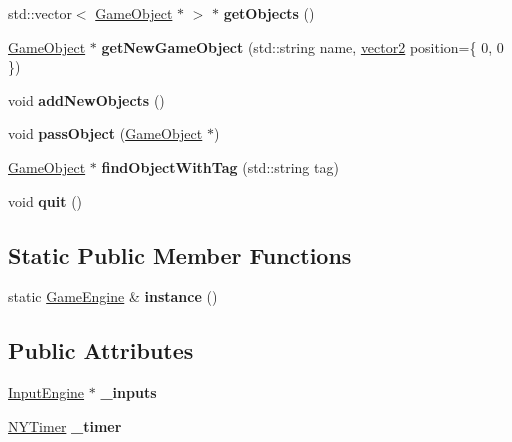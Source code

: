 \begin{DoxyCompactItemize}
\hypertarget{class_game_engine_a0ddc45d96adc0373346663302e429b12}{}\label{class_game_engine_a0ddc45d96adc0373346663302e429b12} 
std\+::vector$<$ \hyperlink{class_game_object}{Game\+Object} $\ast$ $>$ $\ast$ {\bfseries get\+Objects} ()
\item 
\hypertarget{class_game_engine_a5881933816240d7c21d66383ad3abdae}{}\label{class_game_engine_a5881933816240d7c21d66383ad3abdae} 
\hyperlink{class_game_object}{Game\+Object} $\ast$ {\bfseries get\+New\+Game\+Object} (std\+::string name, \hyperlink{structvector2}{vector2} position=\{ 0, 0 \})
\item 
\hypertarget{class_game_engine_a93ae1a7543981d2d3d0e70b14174135f}{}\label{class_game_engine_a93ae1a7543981d2d3d0e70b14174135f} 
void {\bfseries add\+New\+Objects} ()
\item 
\hypertarget{class_game_engine_a49e995c66c1c09394c75d31cbea4b691}{}\label{class_game_engine_a49e995c66c1c09394c75d31cbea4b691} 
void {\bfseries pass\+Object} (\hyperlink{class_game_object}{Game\+Object} $\ast$)
\item 
\hypertarget{class_game_engine_a92a0f7ffa3e36c93b51427dcf36a2586}{}\label{class_game_engine_a92a0f7ffa3e36c93b51427dcf36a2586} 
\hyperlink{class_game_object}{Game\+Object} $\ast$ {\bfseries find\+Object\+With\+Tag} (std\+::string tag)
\item 
\hypertarget{class_game_engine_ad82b626def2e52b28f0d6c2d167589f6}{}\label{class_game_engine_ad82b626def2e52b28f0d6c2d167589f6} 
void {\bfseries quit} ()
\end{DoxyCompactItemize}
\subsection*{Static Public Member Functions}
\begin{DoxyCompactItemize}
\item 
\hypertarget{class_game_engine_a5d5df5f1dabaaa1b98eeb1340f4f118d}{}\label{class_game_engine_a5d5df5f1dabaaa1b98eeb1340f4f118d} 
static \hyperlink{class_game_engine}{Game\+Engine} \& {\bfseries instance} ()
\end{DoxyCompactItemize}
\subsection*{Public Attributes}
\begin{DoxyCompactItemize}
\item 
\hypertarget{class_game_engine_a8d1a51bb0bd082dfddfbcc25bae08ace}{}\label{class_game_engine_a8d1a51bb0bd082dfddfbcc25bae08ace} 
\hyperlink{class_input_engine}{Input\+Engine} $\ast$ {\bfseries \+\_\+inputs}
\item 
\hypertarget{class_game_engine_a84532de3912402092e41bded12137b44}{}\label{class_game_engine_a84532de3912402092e41bded12137b44} 
\hyperlink{class_n_y_timer}{N\+Y\+Timer} {\bfseries \+\_\+timer}
\end{DoxyCompactItemize}
